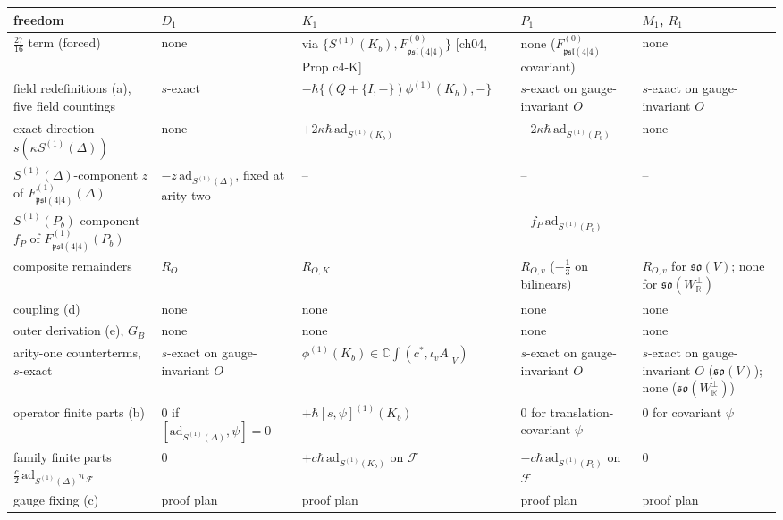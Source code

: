 \begin{tabular}{l|l|l|l|l}
freedom & $D_1$ & $K_1$ & $P_1$ & $M_1$, $R_1$ \\
\hline
$\tfrac{27}{16}$ term (forced) & none & via $\{S^{(1)}(K_b),F^{(0)}_{\mathfrak{psl}(4|4)}\}$ [ch04, Prop c4-K] & none ($F^{(0)}_{\mathfrak{psl}(4|4)}$ covariant) & none \\
field redefinitions (a), five field countings & $s$-exact & $-\hbar\{(Q+\{I,-\})\phi^{(1)}(K_b),-\}$ & $s$-exact on gauge-invariant $O$ & $s$-exact on gauge-invariant $O$ \\
exact direction $s(\kappa S^{(1)}(\Delta))$ & none & $+2\kappa\hbar\,\mathrm{ad}_{S^{(1)}(K_b)}$ & $-2\kappa\hbar\,\mathrm{ad}_{S^{(1)}(P_b)}$ & none \\
$S^{(1)}(\Delta)$-component $z$ of $F^{(1)}_{\mathfrak{psl}(4|4)}(\Delta)$ & $-z\,\mathrm{ad}_{S^{(1)}(\Delta)}$, fixed at arity two & -- & -- & -- \\
$S^{(1)}(P_b)$-component $f_P$ of $F^{(1)}_{\mathfrak{psl}(4|4)}(P_b)$ & -- & -- & $-f_P\,\mathrm{ad}_{S^{(1)}(P_b)}$ & -- \\
composite remainders & $R_O$ & $R_{O,K}$ & $R_{O,v}$ ($-\tfrac13$ on bilinears) & $R_{O,v}$ for $\mathfrak{so}(V)$; none for $\mathfrak{so}(W_{\mathbb R}^\perp)$ \\
coupling (d) & none & none & none & none \\
outer derivation (e), $G_B$ & none & none & none & none \\
arity-one counterterms, $s$-exact & $s$-exact on gauge-invariant $O$ & $\phi^{(1)}(K_b)\in\mathbb C\int(c^*,\iota_vA|_V)$ & $s$-exact on gauge-invariant $O$ & $s$-exact on gauge-invariant $O$ ($\mathfrak{so}(V)$); none ($\mathfrak{so}(W_{\mathbb R}^\perp)$) \\
operator finite parts (b) & $0$ if $[\mathrm{ad}_{S^{(1)}(\Delta)},\psi]=0$ & $+\hbar[s,\psi]^{(1)}(K_b)$ & $0$ for translation-covariant $\psi$ & $0$ for covariant $\psi$ \\
family finite parts $\tfrac c2\,\mathrm{ad}_{S^{(1)}(\Delta)}\pi_{\mathcal F}$ & $0$ & $+c\hbar\,\mathrm{ad}_{S^{(1)}(K_b)}$ on $\mathcal F$ & $-c\hbar\,\mathrm{ad}_{S^{(1)}(P_b)}$ on $\mathcal F$ & $0$ \\
gauge fixing (c) & proof plan & proof plan & proof plan & proof plan \\
\end{tabular}

